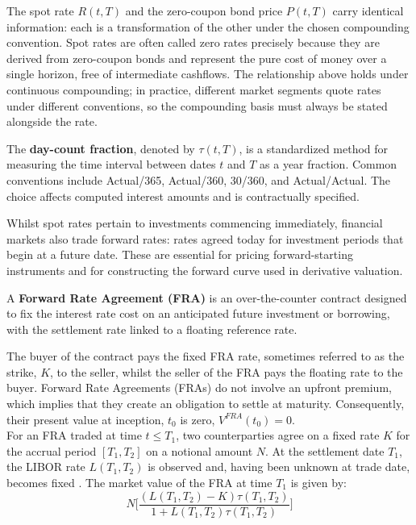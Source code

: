     \noindent
    The spot rate $R(t,T)$ and the zero-coupon bond price $P(t,T)$ carry identical information: each is a transformation of the other under the chosen compounding convention. Spot rates are often called zero rates precisely because they are derived from zero-coupon bonds and represent the pure cost of money over a single horizon, free of intermediate cashflows. The relationship above holds under continuous compounding; in practice, different market segments quote rates under different conventions, so the compounding basis must always be stated alongside the rate. \\
    
    \begin{definition}\label{def:day_count_fraction}
    The \textbf{day-count fraction}, denoted by  $\tau(t,T)$, is a standardized method for measuring the time interval between dates $t$ and  $T$ as a year fraction. Common conventions include Actual/365, Actual/360, 30/360, and Actual/Actual. The choice affects computed interest amounts and is contractually specified. \\
    \end{definition}
      
    \noindent  
    Whilst spot rates pertain to investments commencing immediately, financial markets also trade forward rates: rates agreed today for investment periods that begin at a future date. These are essential for pricing forward-starting instruments and for constructing the forward curve used in derivative valuation. \\

    \begin{definition}\label{def:FRA}
    A \textbf{Forward Rate Agreement (FRA)} is an over-the-counter contract designed to fix the interest rate cost on an anticipated future investment or borrowing, with the settlement rate linked to a floating reference rate.
    \end{definition}

    \noindent
    The buyer of the contract pays the fixed FRA rate, sometimes referred to as the strike, $K$, to the seller, whilst the seller of the FRA pays the floating rate to the buyer. Forward Rate Agreements (FRAs) do not involve an upfront premium, which implies that they create an obligation to settle at maturity. Consequently, their present value at inception, $t_0$ is zero, $V^{FRA}(t_0) =0$. \\

    \noindent
    For an FRA traded at time $t \le T_1$, two counterparties agree on a fixed rate $K$ for the accrual period $[T_1,T_2]$ on a notional amount $N$. At the settlement date $T_1$, the LIBOR rate $L(T_1,T_2)$ is observed and, having been unknown at trade date, becomes fixed \cite{duffy2013c, brigo2001interest}. The market value of the FRA at time $T_1$ is given by:
     \begin{equation}
         N \Big[\frac{(L(T_1,T_2)-K)\tau{(T_1,T_2)}}{1+L(T_1,T_2)\tau(T_1,T_2)}\Big]
     \end{equation}

